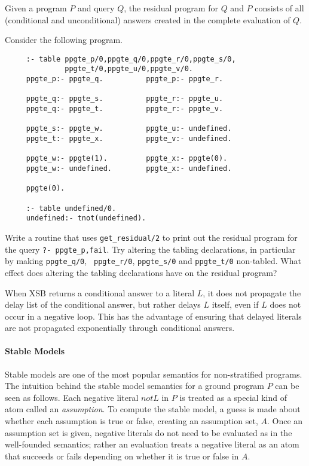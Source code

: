 Given a program $P$ and query $Q$, the residual program for $Q$ and
$P$ consists of all (conditional and unconditional) answers created in
the complete evaluation of $Q$.  

\begin{exercise} \label{ex:pos-delay}
Consider the following program.
\begin{verbatim}
     :- table ppgte_p/0,ppgte_q/0,ppgte_r/0,ppgte_s/0,
              ppgte_t/0,ppgte_u/0,ppgte_v/0.
     ppgte_p:- ppgte_q.          ppgte_p:- ppgte_r.

     ppgte_q:- ppgte_s.          ppgte_r:- ppgte_u.
     ppgte_q:- ppgte_t.          ppgte_r:- ppgte_v.

     ppgte_s:- ppgte_w.          ppgte_u:- undefined.
     ppgte_t:- ppgte_x.          ppgte_v:- undefined.

     ppgte_w:- ppgte(1).         ppgte_x:- ppgte(0).
     ppgte_w:- undefined.        ppgte_x:- undefined.

     ppgte(0).

     :- table undefined/0.
     undefined:- tnot(undefined).
\end{verbatim}
Write a routine that uses {\tt get\_residual/2} to print out the
residual program for the query {\tt ?- ppgte\_p,fail}.  Try altering the
tabling declarations, in particular by making {\tt ppgte\_q/0}, {\tt
ppgte\_r/0}, {\tt ppgte\_s/0} and {\tt ppgte\_t/0} non-tabled.  What
effect does altering the tabling declarations have on the residual
program?
\end{exercise}

When XSB returns a conditional answer to a literal $L$, it does not
propagate the delay list of the conditional answer, but rather delays
$L$ itself, even if $L$ does not occur in a negative loop.  This has
the advantage of ensuring that delayed literals are not propagated
exponentially through conditional answers.

\paragraph*{Stable Models}

Stable models are one of the most popular semantics for non-stratified
programs.  The intuition behind the stable model semantics for a
ground program $P$ can be seen as follows.  Each negative literal $not
L$ in $P$ is treated as a special kind of atom called an {\em
assumption}.  To compute the stable model, a guess is made about
whether each assumption is true or false, creating an assumption set,
$A$.  Once an assumption set is given, negative literals do not need
to be evaluated as in the well-founded semantics; rather an evaluation
treats a negative literal as an atom that succeeds or fails depending
on whether it is true or false in $A$.

